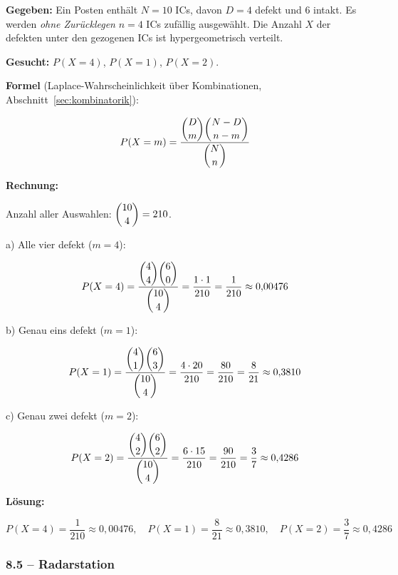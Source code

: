 \begin{beispiel}

\textbf{Gegeben:} Ein Posten enthält $N = 10$ ICs, davon $D = 4$ defekt und
$6$ intakt. Es werden \emph{ohne Zurücklegen} $n = 4$ ICs zufällig ausgewählt.
Die Anzahl $X$ der defekten unter den gezogenen ICs ist hypergeometrisch
verteilt.

\textbf{Gesucht:} $P(X = 4)$, $P(X = 1)$, $P(X = 2)$.

\textbf{Formel} (Laplace-Wahrscheinlichkeit über Kombinationen,
Abschnitt~\ref{sec:kombinatorik}):

$$
P(X = m) = \frac{\dbinom{D}{m}\dbinom{N-D}{\,n-m\,}}{\dbinom{N}{n}}
$$

\textbf{Rechnung:}

Anzahl aller Auswahlen: $\dbinom{10}{4} = 210$.

a) Alle vier defekt ($m = 4$):

$$
P(X = 4) = \frac{\dbinom{4}{4}\dbinom{6}{0}}{\dbinom{10}{4}}
         = \frac{1 \cdot 1}{210} = \frac{1}{210} \approx 0{,}00476
$$

b) Genau eins defekt ($m = 1$):

$$
P(X = 1) = \frac{\dbinom{4}{1}\dbinom{6}{3}}{\dbinom{10}{4}}
         = \frac{4 \cdot 20}{210} = \frac{80}{210} = \frac{8}{21} \approx 0{,}3810
$$

c) Genau zwei defekt ($m = 2$):

$$
P(X = 2) = \frac{\dbinom{4}{2}\dbinom{6}{2}}{\dbinom{10}{4}}
         = \frac{6 \cdot 15}{210} = \frac{90}{210} = \frac{3}{7} \approx 0{,}4286
$$

\textbf{Lösung:}

$$
\boxed{P(X = 4) = \frac{1}{210} \approx 0{,}00476, \quad
P(X = 1) = \frac{8}{21} \approx 0{,}3810, \quad
P(X = 2) = \frac{3}{7} \approx 0{,}4286}
$$

\end{beispiel}

\subsubsection*{8.5 – Radarstation}


